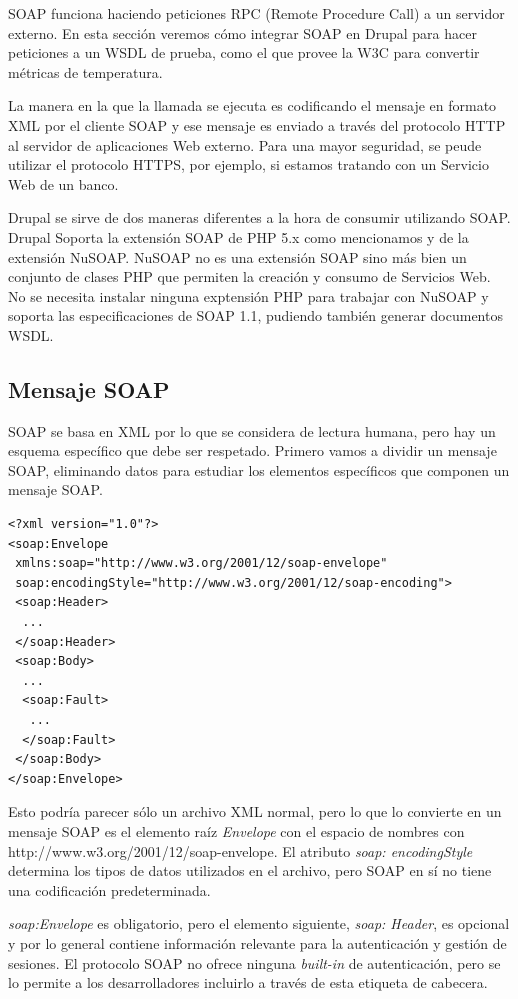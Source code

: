 SOAP funciona haciendo peticiones RPC (Remote Procedure Call) a un servidor externo. En esta sección veremos 
cómo integrar SOAP en Drupal para hacer peticiones a un WSDL de prueba, como el que provee la W3C para convertir 
métricas de temperatura.

La manera en la que la llamada se ejecuta es codificando el mensaje en formato XML por el cliente SOAP y 
ese mensaje es enviado a través del protocolo HTTP al servidor de aplicaciones Web externo. Para una mayor 
seguridad, se peude utilizar el protocolo HTTPS, por ejemplo, si estamos tratando con un Servicio Web de un banco.
   
Drupal se sirve de dos maneras diferentes a la hora de consumir utilizando SOAP. Drupal Soporta la extensión SOAP  
de PHP 5.x como mencionamos y de la extensión NuSOAP. NuSOAP no es una extensión SOAP sino más bien un conjunto 
de clases PHP que permiten la creación y consumo de Servicios Web. No se necesita instalar ninguna exptensión PHP 
para trabajar con NuSOAP y soporta las especificaciones de SOAP 1.1, pudiendo también generar documentos WSDL.


\subsection{Mensaje SOAP}

SOAP se basa en XML por lo que se considera de lectura humana, pero hay un esquema específico que debe 
ser respetado. Primero vamos a dividir un mensaje SOAP, eliminando datos para estudiar los elementos 
específicos que componen un mensaje SOAP.

\begin{verbatim}
<?xml version="1.0"?>
<soap:Envelope
 xmlns:soap="http://www.w3.org/2001/12/soap-envelope"
 soap:encodingStyle="http://www.w3.org/2001/12/soap-encoding">
 <soap:Header>
  ...
 </soap:Header>
 <soap:Body>
  ...
  <soap:Fault>
   ...
  </soap:Fault>
 </soap:Body>
</soap:Envelope>
\end{verbatim}

Esto podría parecer sólo un archivo XML normal, pero lo que lo convierte en un mensaje SOAP es el elemento 
raíz \textit{Envelope} con el espacio de nombres con http://www.w3.org/2001/12/soap-envelope. El atributo 
\textit{soap: encodingStyle} determina los tipos de datos utilizados en el archivo, pero SOAP en sí no 
tiene una codificación predeterminada.

\textit{soap:Envelope} es obligatorio, pero el elemento siguiente, \textit{soap: Header}, es opcional y 
por lo general contiene información relevante para la autenticación y gestión de sesiones. 
El protocolo SOAP no ofrece ninguna \textit{built-in} de autenticación, pero se lo permite a los desarrolladores 
incluirlo a través de esta etiqueta de cabecera.

